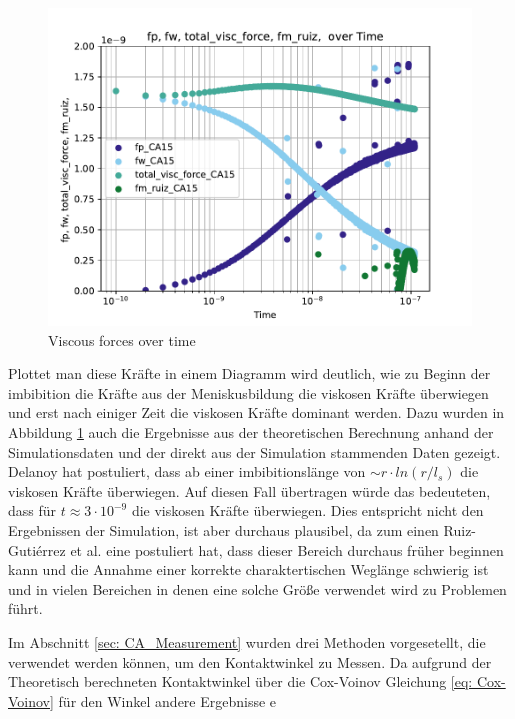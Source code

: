 \begin{figure}[h]
    \centering
    \includegraphics[width=.95\textwidth]{Pictures/log_fp_fw_total_visc_force_fm_ruiz_overTime.pdf}
    \caption{Viscous forces over time}
    \label{fig: forcesOverTime}
\end{figure}




Plottet man diese Kräfte in einem Diagramm wird deutlich, wie zu Beginn der imbibition die Kräfte aus der Meniskusbildung die viskosen Kräfte überwiegen und erst nach einiger Zeit die viskosen Kräfte dominant werden. Dazu wurden in Abbildung \ref*{fig: forcesOverTime} auch die Ergebnisse aus der theoretischen Berechnung anhand der Simulationsdaten und der direkt aus der Simulation stammenden Daten gezeigt. Delanoy hat postuliert, dass ab einer imbibitionslänge von $\sim r\cdot ln(r/l_s)$ die viskosen Kräfte überwiegen. Auf diesen Fall übertragen würde das bedeuteten, dass für $t\approx 3\cdot 10^{-9}$ die viskosen Kräfte überwiegen. Dies entspricht nicht den Ergebnissen der Simulation, ist aber durchaus plausibel, da zum einen Ruiz-Gutiérrez et al. \cite{ruiz-gutierrez2022LongCrossoverDynamics} eine postuliert hat, dass dieser Bereich durchaus früher beginnen kann und die Annahme einer korrekte charaktertischen Weglänge schwierig ist und in vielen Bereichen in denen eine solche Größe verwendet wird zu Problemen führt. 


Im Abschnitt \ref{sec: CA_Measurement} wurden drei Methoden vorgesetellt, die verwendet werden können, um den Kontaktwinkel zu Messen. Da aufgrund der Theoretisch berechneten Kontaktwinkel über die Cox-Voinov Gleichung \ref*{eq: Cox-Voinov} für den Winkel andere Ergebnisse e

